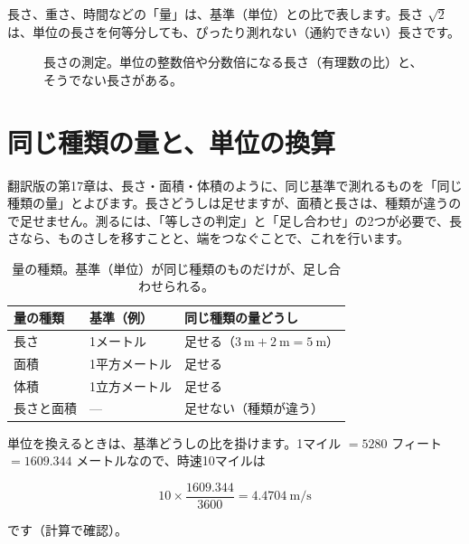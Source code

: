 \documentclass[a4paper,11pt,openany]{ltjsbook}
\begin{document}
長さ、重さ、時間などの「量」は、基準（単位）との比で表します。長さ $\sqrt2$ は、単位の長さを何等分しても、ぴったり測れない（通約できない）長さです。

\begin{figure}[htbp]
\centering
{}
\caption{長さの測定。単位の整数倍や分数倍になる長さ（有理数の比）と、そうでない長さがある。}
\end{figure}


\section{同じ種類の量と、単位の換算}

翻訳版の第17章は、長さ・面積・体積のように、同じ基準で測れるものを「同じ種類の量」とよびます。長さどうしは足せますが、面積と長さは、種類が違うので足せません。測るには、「等しさの判定」と「足し合わせ」の2つが必要で、長さなら、ものさしを移すことと、端をつなぐことで、これを行います。

\begin{table}[htbp]
\centering
\begin{tabular}{lll}
\toprule
量の種類 & 基準（例） & 同じ種類の量どうし\\
\midrule
長さ & 1メートル & 足せる（$3\ \mathrm{m}+2\ \mathrm{m}=5\ \mathrm{m}$）\\
面積 & 1平方メートル & 足せる\\
体積 & 1立方メートル & 足せる\\
長さと面積 & — & 足せない（種類が違う）\\
\bottomrule
\end{tabular}
\caption{量の種類。基準（単位）が同じ種類のものだけが、足し合わせられる。}
\end{table}

単位を換えるときは、基準どうしの比を掛けます。1マイル $=5280$ フィート $=1609.344$ メートルなので、時速10マイルは

\[
10\times\frac{1609.344}{3600}=4.4704\ \mathrm{m/s}
\]

です（計算で確認）。
\end{document}
